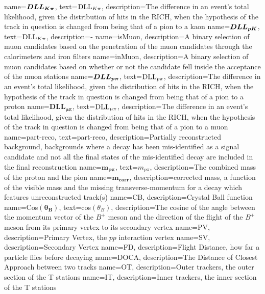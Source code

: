 {
	name=$\mathbold{DLL_{\kaon\pi}}$,
		text=$\mathrm{DLL}_{{K}{\pi}}$,
		description={The difference in an event’s total likelihood, given the distribution of hits in the RICH, when the hypothesis of the track in question is changed from being that of a pion to a kaon
		}}
{
	name=$\mathbold{DLL_{\proton\kaon}}$,
		text=$\mathrm{DLL}_{{K}{\pi}}$,
		description={\dllppi-\dllkpi}}
{
	name=isMuon,
		description={A binary selection of muon candidates based on the penetration of the muon candidates through the calorimeters and iron filters}
}
{
	name=inMuon,
		description={A binary selection of muon candidates based on whether or not the candidate fell inside the acceptance of the muon stations}
}                                        
{
	name=$\mathbold{DLL_{\proton\pi}}$,
		text=$\mathrm{DLL}_{{p}{\pi}}$,
		description={The difference in an event’s total likelihood, given the distribution of hits in the RICH, when the hypothesis of the track in question is changed from being that of a pion to a proton}                
}
{
	name=$\mathbold{DLL_{\mu\pi}}$,
		text=$\mathrm{DLL}_{{\mu}\pi}$,
		description={The difference in an event’s total likelihood, given the distribution of hits in the RICH, when the hypothesis of the track in question is changed from being that of a pion to a muon 
		}}
{
	name=part-reco,
		text=part-reco,
		description={Partially reconstructed background, backgrounds where a decay has been mis-identified as a signal candidate and not all the final states of the mis-identified decay are included in the final reconstruction  
		}}
{
	name=$\mathbold{m_{p\pi}}$,
		text=$m_{p\pi}$,
		description={The combined mass of the proton and the pion}
}
{
	name=$\mathbold{m_{corr}}$,
		description={corrected mass, a function of the visible mass and the missing transverse-momentum for a decay which features unreconstructed track(s)}
}                 
{
	name=CB,
		description={Crystal Ball function}
}                 
{
	        name=Cos$(\mathbold{\theta_{B}})$,
                text=cos$({\theta_{B}})$,
		description={The cosine of the angle between the momentum vector of the $B^{+}$ meson and the direction of the flight of the $B^{+}$ meson from its primary vertex to its secondary vertex }
}
{
	name=PV,
		description={Primary Vertex, the $pp$ interaction vertex}
}
{
	name=SV,
		description={Secondary Vertex}
}
{
	name=FD,
		description={Flight Distance, how far a particle flies before decaying}
}                                                                      
{
	name=DOCA,
		description={The Distance of Closest Approach between two tracks} 
}
{
	name=OT,
		description={Outer trackers, the outer section of the T stations} 
}
{
	name=IT,
		description={Inner trackers, the inner section of the T stations} 
}

